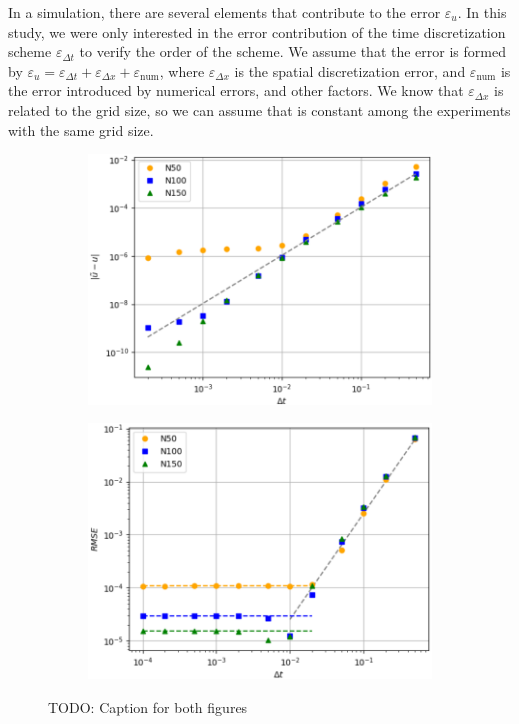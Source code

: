 \documentclass[
  english,        %
  font=times,     %
  onecolumn,      %
]{tumarticle}
\begin{document}
In a simulation, there are several elements that contribute to the error $\varepsilon_{u}$. In this study, we were only interested in the error contribution of the time discretization scheme $\varepsilon_{\Delta t}$ to verify the order of the scheme. We assume that the error is formed by $\varepsilon_u = \varepsilon_{\Delta t} + \varepsilon_{\Delta x} + \varepsilon_\text{num}$, where $\varepsilon_{\Delta x}$ is the spatial discretization error, and $\varepsilon_\text{num}$ is the error introduced by numerical errors, and other factors. We know that $\varepsilon_{\Delta x}$ is related to the grid size, so we can assume that is constant among the experiments with the same grid size.

\begin{figure}[!htbp]
    \centering
    \begin{subfigure}[b]{0.49\textwidth}
      \includegraphics[width=\textwidth]{resources/convergence_study_openfoam.png}
      \caption{}
      \label{fig:convergence_openfoam}
    \end{subfigure}
    \hspace{1pt}
    \begin{subfigure}[b]{0.49\textwidth}
      \includegraphics[width=\textwidth]{resources/RMSE_study.png}
      \caption{}
      \label{fig:RMSE_openfoam}
    \end{subfigure}
    \caption{TODO: Caption for both figures}
    \label{fig:figures}
  \end{figure}
\end{document}
